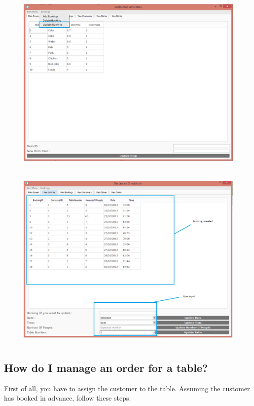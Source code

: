\begin{figure}[H]
    \includegraphics[height = 9cm]{./Manual/images/UpdateBooking1} 
    \caption{} \label{fig:updatebooking1}
\end{figure}

\begin{figure}[H]
    \includegraphics[height = 9cm]{./Manual/images/UpdateBooking2} 
    \caption{} \label{fig:updatebooking2}
\end{figure}

\newpage
\subsection{How do I manage an order for a table?}
First of all, you have to assign the customer to the table. Assuming the customer has booked in advance, follow these steps:

